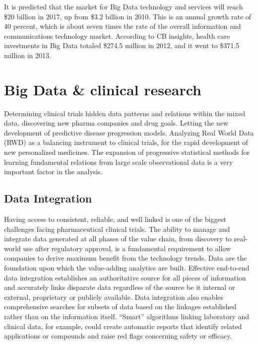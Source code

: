 \documentclass[sigconf]{acmart}
\begin{document}
It is predicted that the market for Big Data technology and services
will reach \$20 billion in 2017, up from \$3.2 billion in 2010. 
This is an annual growth rate of 40 percent, which is about seven 
times the rate of the overall information and communications 
technology market. According to CB insights, health care investments
in Big Data totaled \$274.5 million in 2012, and it went to \$371.5 
million in 2013\cite{TR03}.

\section{Big Data \& clinical research}
Determining clinical trials hidden data patterns and relations within
the mixed data, discovering new pharma companies and drug goals.
Letting the new development of predictive disease progression models.
Analyzing Real World Data (RWD) as a balancing instrument to 
clinical trials, for the rapid development of new personalized 
medicines. The expansion of progressive statistical methods for 
learning fundamental relations from large scale observational data is a
very important factor in the analysis\cite{TR04}.

\subsection{Data Integration}
Having access to consistent, reliable, and well linked is one 
of the biggest challenges facing pharmaceutical clinical trials. The
ability to manage and integrate data generated at all phases of the
value chain, from discovery to real-world use after regulatory 
approval, is a fundamental requirement to allow companies to derive
maximum benefit from the technology trends. Data are the foundation
upon which the value-adding analytics are built. Effective end-to-end
data integration establishes an authoritative source for all pieces of
information and accurately links disparate data regardless of the 
source be it internal or external, proprietary or publicly available.
Data integration also enables comprehensive searches for subsets of
data based on the linkages established rather than on the information
itself. ``Smart'' algorithms linking laboratory and clinical data, for
example, could create automatic reports that identify related 
applications or compounds and raise red flags concerning safety or 
efficacy\cite{TR02}.
\end{document}
